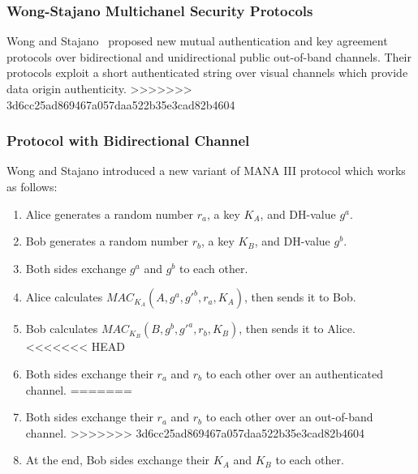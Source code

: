 \subsubsection{Wong-Stajano Multichanel Security Protocols}\label{WS}

Wong and Stajano~\cite{10.1109/MPRV.2007.76} proposed new mutual authentication and key agreement protocols over bidirectional and unidirectional public out-of-band channels. Their protocols exploit a short authenticated string over visual channels which provide data origin authenticity. 
>>>>>>> 3d6cc25ad869467a057daa522b35e3cad82b4604

\subsubsection*{Protocol with Bidirectional Channel}

Wong and Stajano introduced a new variant of MANA III protocol which works as follows:

\begin{enumerate}
\item Alice generates a random number $r_a$, a key $K_A$, and DH-value $g^a$.
\item Bob generates a random number $r_b$, a key $K_B$, and DH-value $g^b$.
\item Both sides exchange $g^a$ and $g^b$ to each other.
\item Alice calculates $MAC_{K_A}(A,g^a,g'^b,r_a,K_A)$, then sends it to Bob. 
\item Bob calculates $MAC_{K_B}(B,g^b,g'^a,r_b,K_B)$, then sends it to Alice.
<<<<<<< HEAD
\item Both sides exchange their $r_a$ and $r_b$ to each other over an authenticated channel. 
=======
\item Both sides exchange their $r_a$ and $r_b$ to each other over an out-of-band channel. 
>>>>>>> 3d6cc25ad869467a057daa522b35e3cad82b4604
\item At the end, Bob sides exchange their $K_A$ and $K_B$ to each other. 
\end{enumerate}

